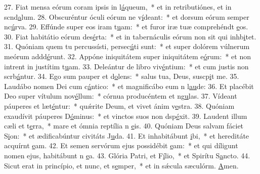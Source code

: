 27. Fiat mensa eórum coram ipsis in l\uline{á}queum,~* et in retributiónes, et in scnd\uline{a}lum.
28. Obscuréntur óculi eórum ne v\uline{í}deant:~* et dorsum eórum semper nc\uline{ú}rva.
29. Effúnde super eos iram t\uline{u}am:~* et furor iræ tuæ comprehéndt \uline{e}os.
30. Fiat habitátio eórum des\uline{é}rta:~* et in tabernáculis eórum non sit qui inhb\uline{i}tet.
31. Quóniam quem tu percussísti, persec\uline{ú}ti sunt:~* et super dolórem vúlnerum meórum addd\uline{é}runt.
32. Appóne iniquitátem super iniquitátem e\uline{ó}rum:~* et non intrent in justítim t\uline{u}am.
33. Deleántur de libro viv\uline{é}ntium:~* et cum justis non scrb\uline{á}ntur.
34. Ego sum pauper et d\uline{o}lens:~* salus tua, Deus, suscp\uline{i}t me.
35. Laudábo nomen Dei cum c\uline{á}ntico:~* et magnificábo eum n l\uline{au}de:
36. Et placébit Deo super vítulum nov\uline{é}llum:~* córnua producéntem et ng\uline{u}las.
37. Vídeant páuperes et læt\uline{é}ntur:~* quǽrite Deum, et vivet ánim v\uline{e}stra.
38. Quóniam exaudívit páuperes D\uline{ó}minus:~* et vinctos suos non dsp\uline{é}xit.
39. Laudent illum cæli et t\uline{e}rra,~* mare et ómnia reptília n \uline{e}is.
40. Quóniam Deus salvam fáciet S\uline{i}on:~* et ædificabúntur civitáts J\uline{u}da.
41. Et inhabitábunt \uline{i}bi,~* et hereditáte acquírnt \uline{e}am.
42. Et semen servórum ejus possidébit \uline{e}am:~* et qui díligunt nomen ejus, habitábunt n \uline{e}a.
43. Glória Patri, et F\uline{í}lio,~* et Spirítu S\uline{a}ncto.
44. Sicut erat in princípio, et nunc, et s\uline{e}mper,~* et in sǽcula sæculórm. \uline{A}men.
